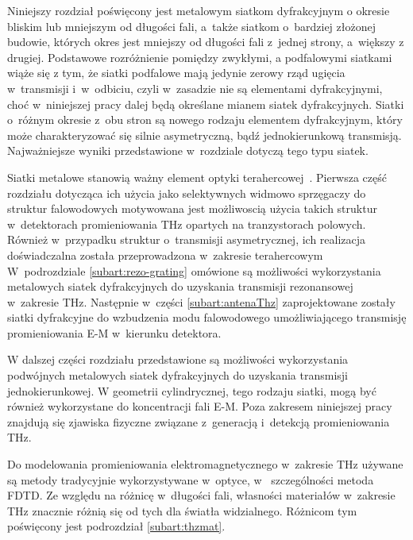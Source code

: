 Niniejszy rozdział poświęcony jest metalowym siatkom dyfrakcyjnym o okresie bliskim lub mniejszym od długości fali, a~także siatkom o~bardziej złożonej budowie, których okres jest mniejszy od długości fali z~jednej strony, a~większy z drugiej. Podstawowe rozróżnienie pomiędzy zwykłymi, a podfalowymi siatkami wiąże się z tym, że siatki podfalowe mają jedynie zerowy rząd ugięcia w~transmisji i~w~odbiciu, czyli w~zasadzie nie są elementami dyfrakcyjnymi, choć w~niniejszej pracy dalej będą określane mianem siatek dyfrakcyjnych. Siatki o~różnym okresie z~obu stron są nowego rodzaju elementem dyfrakcyjnym, który może charakteryzować się silnie asymetryczną, bądź jednokierunkową transmisją. Najważniejsze wyniki przedstawione w~rozdziale dotyczą tego typu siatek.

Siatki metalowe stanowią ważny element optyki terahercowej~\cite{zhang2010introduction}. Pierwsza część rozdziału dotycząca ich użycia jako selektywnych widmowo sprzęgaczy do struktur falowodowych motywowana jest możliwoscią użycia takich struktur w~detektorach promieniowania THz opartych na tranzystorach polowych. Również w~przypadku struktur o~transmisji asymetrycznej, ich realizacja doświadczalna została przeprowadzona w~zakresie terahercowym~ W~podrozdziale \ref{subart:rezo-grating} omówione są możliwości wykorzystania metalowych siatek dyfrakcyjnych do uzyskania transmisji rezonansowej w~zakresie THz. Następnie w~części \ref{subart:antenaThz} zaprojektowane zostały siatki dyfrakcyjne do wzbudzenia modu falowodowego umożliwiającego transmisję promieniowania E-M w~kierunku detektora.

W dalszej części rozdziału przedstawione są możliwości wykorzystania podwójnych metalowych siatek dyfrakcyjnych do uzyskania transmisji jednokierunkowej. W geometrii cylindrycznej, tego rodzaju siatki, mogą być również wykorzystane do koncentracji fali E-M. Poza zakresem niniejszej pracy znajdują się zjawiska fizyczne związane z~generacją i~detekcją promieniowania THz.

Do modelowania promieniowania elektromagnetycznego w~zakresie THz używane są metody tradycyjnie wykorzystywane w~optyce, w~ szczególności metoda FDTD. Ze względu na różnicę w~długości fali, własności materiałów w~zakresie THz znacznie różnią się od tych dla światła widzialnego. Różnicom tym poświęcony jest podrozdział \ref{subart:thzmat}.
